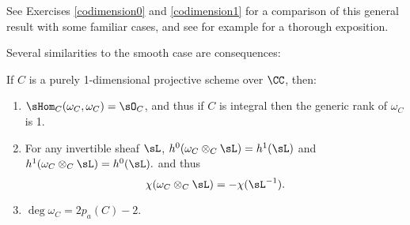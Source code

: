 See Exercises \ref{codimension0} and \ref{codimension1} for a comparison of this general result with some
familiar cases, and see for example \cite{AltmanKleiman} for a thorough exposition.

Several similarities to the smooth case are consequences:

\begin{proposition}\label{similarities}
If $C$ is a purely 1-dimensional projective scheme over $\CC$, then:
\begin{enumerate}

\item $\sHom_C(\omega_C, \omega_C) = \sO_C$, and  thus if $C$ is integral then the generic rank of $\omega_C$ is 1.

\item For any invertible sheaf $\sL$, 
$h^0(\omega_C\otimes_C\sL ) = h^1(\sL)$ and
$h^1(\omega_C\otimes_C\sL)= h^0(\sL).$
and thus
$$
\chi(\omega_C\otimes_C\sL)= -\chi(\sL^{-1}).
$$

\item $\deg \omega_C = 2p_a(C) -2.$

\end{enumerate}
\end{proposition}

